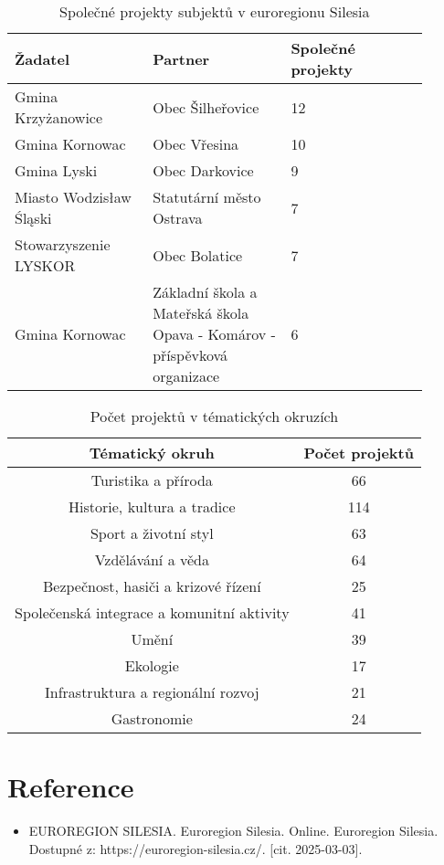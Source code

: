 \documentclass[a4paper,12pt,twoside,FP]{article}
\begin{document}
\bgroup
\begin{table}[H]
	\centering
	\renewcommand{\arraystretch}{1.25}%
	\begin{tabular}{|p{0.3\linewidth}|p{0.3\linewidth}|p{0.3\linewidth}|}
		\hline
		\textbf{Žadatel} & \textbf{Partner} & \textbf{Společné projekty} \\
		\hline
		Gmina Krzyżanowice & Obec Šilheřovice & 12 \\
		\hline
		Gmina Kornowac & Obec Vřesina & 10 \\
		\hline
		Gmina Lyski & Obec Darkovice & 9 \\
		\hline
		Miasto Wodzisław Śląski & Statutární město Ostrava & 7 \\
		\hline
		Stowarzyszenie LYSKOR & Obec Bolatice & 7 \\
		\hline
		Gmina Kornowac & Základní škola a Mateřská škola Opava - Komárov - příspěvková organizace & 6 \\
		\hline
	\end{tabular}
	
	\caption{Společné projekty subjektů v euroregionu Silesia}
\end{table}
\egroup

\bgroup
\begin{table}[H]
	\centering
	\renewcommand{\arraystretch}{1.25}%
	
	\begin{tabular}{|c|c|}
		\hline
		\textbf{Tématický okruh} & \textbf{Počet projektů} \\
		\hline
		Turistika a příroda  & 66  \\
		\hline
		Historie, kultura a tradice & 114  \\
		\hline
		Sport a životní styl & 63  \\
		\hline
		Vzdělávání a věda & 64  \\
		\hline
		Bezpečnost, hasiči a krizové řízení & 25  \\
		\hline
		Společenská integrace a komunitní aktivity & 41  \\
		\hline
		Umění  & 39  \\
		\hline
		Ekologie  & 17  \\
		\hline
		Infrastruktura a regionální rozvoj & 21  \\
		\hline
		Gastronomie & 24  \\
		\hline
	\end{tabular}
	
	\caption{Počet projektů v tématických okruzích}
\end{table}
\egroup

\clearpage
\section*{Reference}
\begin{itemize}
	\item EUROREGION SILESIA. Euroregion Silesia. Online. Euroregion Silesia. Dostupné z: https://euroregion-silesia.cz/. [cit. 2025-03-03].
\end{itemize}
\end{document}
